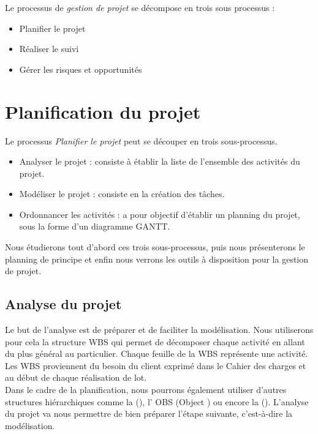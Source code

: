 
Le processus de \textit{gestion de projet} se décompose en trois sous processus : 
\begin{itemize}
\item Planifier le projet
\item Réaliser le suivi
\item Gérer les risques et opportunités
\end{itemize}

\section{Planification du projet}
\label{planification}

Le processus \textit{Planifier le projet} peut se découper en trois sous-processus.

\begin{itemize}
\item Analyser le projet : consiste à établir la liste de l'ensemble des activités du projet.
\item Modéliser le projet : consiste en la création des tâches.
\item Ordonnancer les activités : a pour objectif d'établir un planning du projet, sous la forme d'un diagramme GANTT.
\end{itemize}

Nous étudierons tout d'abord ces trois sous-processus, puis nous présenterons le planning de principe et enfin nous verrons les outils à disposition pour la gestion de projet. 

\subsection{Analyse du projet}
\label{analyse}
Le but de l'analyse est de préparer et de faciliter la modélisation. Nous utiliserons pour cela la structure WBS qui permet de décomposer chaque activité en allant du plus général au particulier. Chaque feuille de la WBS représente une activité. Les WBS proviennent du besoin du client exprimé dans le Cahier des charges et au début de chaque réalisation de lot. \\


Dans le cadre de la planification, nous pourrons également utiliser d’autres structures hiérarchiques comme la \FBSCourt (\FBS), l’ OBS (Object \BS) ou encore la \RBSCourt (\RBS). L’analyse du projet va nous permettre de bien préparer l’étape suivante, c’est-à-dire la modélisation.


